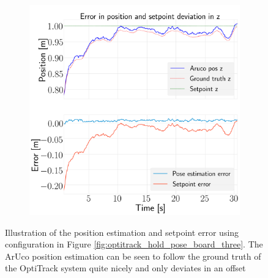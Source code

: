 \documentclass[../Head/report.tex]{subfiles}
\begin{document}
\begin{figure}[H]
\begin{subfigure}[t]{.30\textwidth}
        \caption{}
        \label{fig:optitrack_hold_pose_using_estimated_aruco_pose_error_y_test_five}
    \end{subfigure}
     \hspace{0.2em}
    \begin{subfigure}[t]{.30\textwidth}
        \centering
        \includegraphics[width=\textwidth]{../Figures/optitrack/hold_pose_using_estimated_aruco_pose/pose_error_z_test5.png}
        \caption{}
        \label{fig:optitrack_hold_pose_using_estimated_aruco_pose_error_z_test_five}
    \end{subfigure}
    \caption{Illustration of the position estimation and setpoint error using configuration in Figure \ref{fig:optitrack_hold_pose_board_three}. The ArUco position estimation can be seen to follow the ground truth of the OptiTrack system quite nicely and only deviates in an offset}
    \label{fig:optitrack_hold_pose_using_estimated_aruco_pose_error_pos_test_five}
\end{figure}
\end{document}

